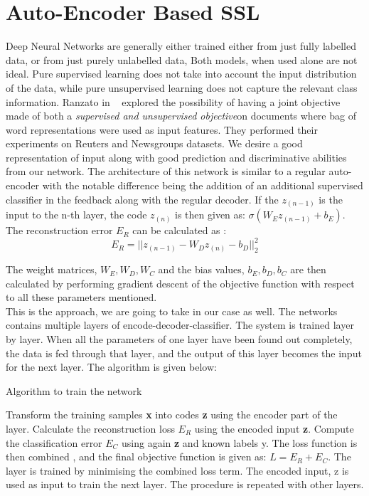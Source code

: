 \documentclass[a4paper,11pt]{kth-mag}
\begin{document}
 \section{Auto-Encoder Based SSL}
 Deep Neural Networks are generally either trained either from just fully labelled data, or from just purely unlabelled data, Both models, when used alone are not ideal. Pure supervised learning does not take into account the input distribution of the data, while pure unsupervised learning does not capture the relevant class information. Ranzato in ~\cite{ranzato-2008} explored the possibility of having a joint objective made of both a \textit{supervised and unsupervised objective}on documents where bag of word representations were used as input features. They performed their experiments on Reuters and Newsgroups datasets.
 We desire a good representation of input along with good prediction and discriminative abilities from our network.
 The architecture of this network is similar to a regular auto-encoder with the notable difference being the addition of an additional supervised classifier in the feedback along with the regular decoder. If the $z_{(n-1)}$ is the input to the n-th layer, the code $z_{(n)}$ is then given as: $\sigma(W_{E}z_{(n-1)} + b_{E})$. The reconstruction error $E_{R}$ can be calculated as :
 \begin{equation}
  E_{R} = ||z_{(n-1)} - W_{D}z_{(n)} -b_{D}||_{2}^{2}
 \end{equation}

The weight matrices, $W_{E}, W_{D}, W_{C}$ and the bias values, $b_{E}, b_{D}, b_{C}$ are then calculated by performing gradient descent of the objective function with respect to all these parameters mentioned. 
\\
This is the approach, we are going to take in our case as well. The networks contains multiple layers of encode-decoder-classifier. The system is trained layer by layer. When all the parameters of one layer have been found out completely, the data is fed through that layer, and the output of this layer becomes the input for the next layer. The algorithm is given below:
 \begin{algorithm}
 \caption{Algorithm to train the network}
 \begin{algorithmic}[1]
 \scriptsize
 \STATE Transform the training samples \textbf{x} into codes \textbf{z} using the encoder part of the layer.
 \STATE Calculate the reconstruction loss $E_{R}$ using the encoded input \textbf{z}. 
 \STATE Compute the classification error $E_{C}$ using again \textbf{z} and known labels y.
 \STATE The loss function is then combined , and the final objective function is given as: $L = E_{R} + E_{C}$.
 \STATE The layer is trained by minimising the combined loss term.
 \STATE The encoded input, z is used as input to train the next layer.
 \STATE The procedure is repeated with other layers.
\end{algorithmic}
\end{algorithm}
 
\end{document}
